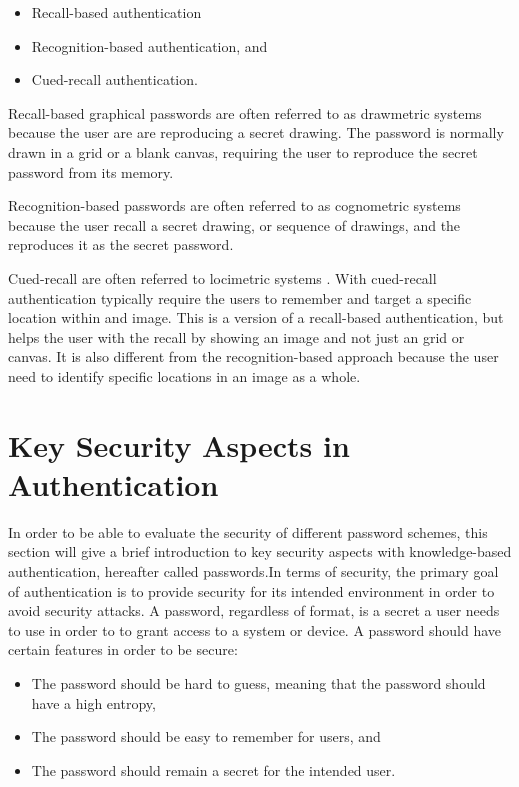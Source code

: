       \begin{itemize}
        \item Recall-based authentication
        \item Recognition-based authentication, and 
        \item Cued-recall authentication.
      \end{itemize}

      Recall-based graphical passwords are often referred to as drawmetric systems \cite{DeAngeli} because the user are are reproducing a secret drawing. The password is normally drawn in a grid or a blank canvas, requiring the user to reproduce the secret password from its memory.

      Recognition-based passwords are often referred to as cognometric systems \cite{DeAngeli} because the user recall a secret drawing, or sequence of drawings, and the reproduces it as the secret password.

      Cued-recall are often referred to locimetric systems \cite{DeAngeli}. With cued-recall authentication typically require the users to remember and target a specific location within and image. This is a version of a recall-based authentication, but helps the user with the recall by showing an image and not just an grid or canvas. It is also different from the recognition-based approach because the user need to identify specific locations in an image as a whole. 

  \section{Key Security Aspects in Authentication}

    In order to be able to evaluate the security of different password schemes, this section will give a brief introduction to key security aspects with knowledge-based authentication, hereafter called passwords.In terms of security, the primary goal of authentication is to provide security for its intended environment in order to avoid security attacks. A password, regardless of format, is a secret a user needs to use in order to to grant access to a system or device. A password should have certain features in order to be secure:

      \begin{itemize}
        \item The password should be hard to guess, meaning that the password should have a high entropy,
        \item The password should be easy to remember for users, and 
        \item The password should remain a secret for the intended user.
      \end{itemize}

